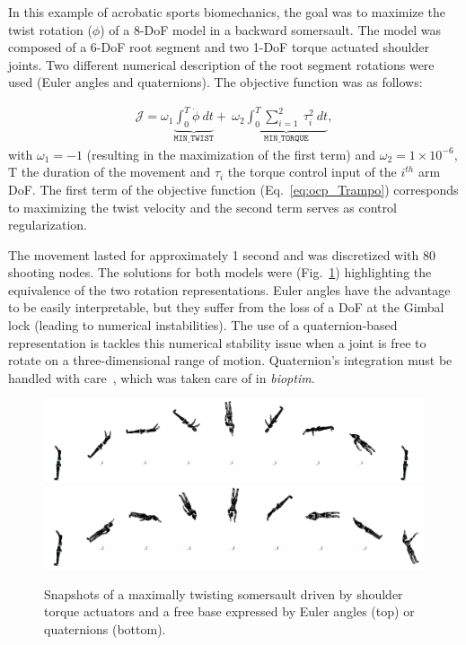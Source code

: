 In this example of acrobatic sports biomechanics, the goal was to maximize the twist rotation ($\phi$) of a 8-DoF model in a backward somersault.
The model was composed of a 6-DoF root segment and two 1-DoF torque actuated shoulder joints.
Two different numerical description of the root segment rotations were used (Euler angles and quaternions).
The objective function was as follows:

\begin{eqnarray}\label{eq:ocp_Trampo}
\mathcal{J} = \omega_1 \underbrace{\int_0^T \dot{\phi}~dt}_{\mathtt{MIN\_TWIST}}  +~\omega_2 \underbrace{\int_0^T \sum_{i=1}^{2}~\tau_{i}^2~dt}_{\mathtt{MIN\_ TORQUE}},
\end{eqnarray}
with $\omega_1 = -1$ (resulting in the maximization of the first term) and $\omega_2 = 1\times 10^{-6}$, T the duration of the movement and $\tau_{i}$ the torque control input of the $i^{th}$ arm DoF.
The first term of the objective function (Eq.~\ref{eq:ocp_Trampo}) corresponds to maximizing the twist velocity and the second term serves as control regularization.


The movement lasted for approximately 1 second and was discretized with 80 shooting nodes.
The solutions for both models were  (Fig.~\ref{fig:snapshots_quaternion_base_twisting_somersault}) highlighting the equivalence of the two rotation representations.
Euler angles have the advantage to be easily interpretable, but they suffer from the loss of a DoF at the Gimbal lock (leading to numerical instabilities).
The use of a quaternion-based representation is tackles this numerical stability issue when a joint is free to rotate on a three-dimensional range of motion.
Quaternion's integration must be handled with care~\cite{bailly2020optimal}, which was taken care of in \textit{bioptim}.


\begin{figure}[t!]
\centering
\includegraphics[width=\textwidth]{figures/Euler_Bioptim_MaxVrille_dos.png}\\
\vspace*{0.5em}
\includegraphics[width=\textwidth]{figures/Quat_Bioptim_MaxVrille_dos.png}
\caption{Snapshots of a maximally twisting somersault driven by shoulder torque actuators and a free base expressed by Euler angles (top) or quaternions (bottom).}
\label{fig:snapshots_quaternion_base_twisting_somersault}
\end{figure}


